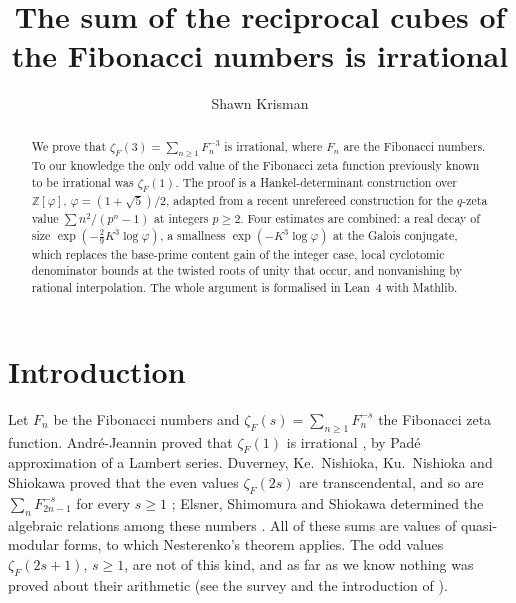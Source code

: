 \documentclass[11pt]{amsart}
\theoremstyle{definition}
\theoremstyle{remark}
\numberwithin{equation}{section}
\newcommand{\ZZ}{\mathbb{Z}}
\begin{document}
\title[Reciprocal cubes of the Fibonacci numbers]{The sum of the reciprocal cubes of the Fibonacci numbers is
irrational}

\author{Shawn Krisman}


\begin{abstract}
We prove that $\zeta_F(3)=\sum_{n\ge1}F_n^{-3}$ is irrational, where $F_n$ are the Fibonacci numbers. To our
knowledge the only odd value of the Fibonacci zeta function previously known to be irrational was $\zeta_F(1)$. The
proof is a Hankel-determinant construction over $\ZZ[\varphi]$, $\varphi=(1+\sqrt5)/2$, adapted from a recent
unrefereed construction for the $q$-zeta value $\sum n^2/(p^n-1)$ at integers $p\ge2$. Four estimates are combined: a
real decay of size $\exp(-\tfrac29K^3\log\varphi)$, a smallness $\exp(-K^3\log\varphi)$ at the Galois conjugate, which
replaces the base-prime content gain of the integer case, local cyclotomic denominator bounds at the twisted roots of
unity that occur, and nonvanishing by rational interpolation. The whole argument is formalised in Lean~4 with
Mathlib.
\end{abstract}

\maketitle

\section{Introduction}

Let $F_n$ be the Fibonacci numbers and $\zeta_F(s)=\sum_{n\ge1}F_n^{-s}$ the Fibonacci zeta function. Andr\'e-Jeannin
proved that $\zeta_F(1)$ is irrational \cite{AJ89}, by Pad\'e approximation of a Lambert series. Duverney,
Ke.~Nishioka, Ku.~Nishioka and Shiokawa proved that the even values $\zeta_F(2s)$ are transcendental, and so are
$\sum_n F_{2n-1}^{-s}$ for every $s\ge1$ \cite{DNNS97}; Elsner, Shimomura and Shiokawa determined the algebraic
relations among these numbers \cite{ESS07,ESS08}. All of these sums are values of quasi-modular forms, to which
Nesterenko's theorem \cite{Nes96} applies. The odd values $\zeta_F(2s+1)$, $s\ge1$, are not of this kind, and as far
as we know nothing was proved about their arithmetic (see the survey \cite{Wal10} and the introduction of
\cite{MS24}).
\end{document}
